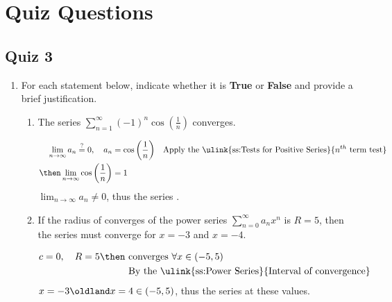 \chapter{Quiz Questions}

\section{Quiz 3}
\begin{enumerate}
  \item For each statement below, indicate whether it is \textbf{True} or
    \textbf{False} and provide a brief justification.

  \begin{enumerate}[itemsep=12em]
    \item The series \(\displaystyle \sum_{n=1}^{\infty} (-1)^n \cos
      \left(\frac{1}{n}\right) \) converges.

      \begin{align*}
        \lim_{n \to \infty} a_n \stackrel{?}{=} 0, \quad a_n &= \cos \left(\frac{1}{n}\right)
        && \text{Apply the \ulink{ss:Tests for Positive Series}{\(n^{th} \) term test}} \\
        \then \lim_{n \to \infty} \cos\left( \frac{1}{n} \right) &= 1
      \end{align*}
      \(\lim_{n \to \infty} a_n \neq 0\), thus the series .

    \item If the radius of converges of the power series \(\displaystyle
      \sum_{n=0}^{\infty} a_nx^n \) is \(R=5\), then the series must converge
      for \(x = -3\) and \(x = -4\).

      \begin{align*}
        c = 0, \quad R = 5 \then ~&\text{converges}~\forall x \in (-5, 5) \\
        &\text{By the \ulink{ss:Power Series}{Interval of convergence}}
      \end{align*}
      \(x = -3 \oldland x = 4 \in (-5, 5)\), thus the series  at
      these values.
  \end{enumerate}


\end{enumerate}

